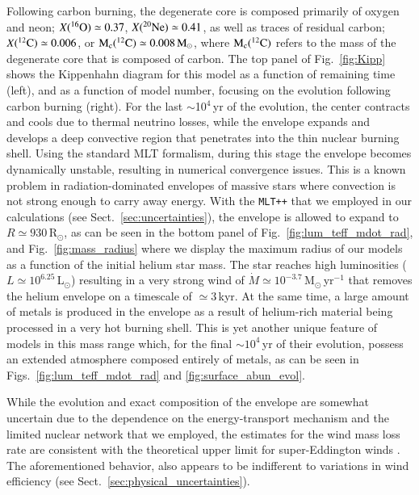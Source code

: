 \documentclass[main.tex]{subfiles}
\begin{document}
Following carbon burning, the degenerate core is composed primarily of oxygen and neon; $X(\iso{O}{16}) \simeq 0.37$, $X(\iso{Ne}{20}) \simeq 0.41$, as well as traces of residual carbon; $X(\iso{C}{12}) \simeq 0.006$, or $ \rm M_c (\iso{C}{12}) \simeq 0.008\msun$, where $\rm M_c (\iso{C}{12})$ refers to the mass of the degenerate core that is composed of carbon. The top panel of Fig.~\ref{fig:Kipp} shows the Kippenhahn diagram for this model as a function of remaining time (left), and as a function of model number, focusing on the evolution following carbon burning (right). 
For the last $\sim$10$^4$\,yr of the evolution, the center contracts and cools due to thermal neutrino losses, while the envelope 
expands and develops a deep convective region that penetrates into the thin nuclear burning shell. Using the standard MLT formalism, during this stage the envelope becomes dynamically unstable, resulting in numerical convergence issues. This is a known 
problem in radiation-dominated envelopes of massive stars where convection is not strong enough to carry away  energy. With the 
\texttt{MLT++} that we employed in our calculations  (see Sect.~\ref{sec:uncertainties}),  the envelope is allowed to expand to $R \simeq 
930$\,R$_\odot$, as can be seen in the bottom panel of Fig.~\ref{fig:lum_teff_mdot_rad}, and Fig.~\ref{fig:mass_radius} where
we display the maximum radius of our \seriesone models as a function of the initial helium star mass. The star reaches high luminosities ($L \simeq 10^{6.25}$\,L$_\odot$) 
resulting in a very strong wind of $\dot{M} \simeq 
10^{-3.7}$\,M$_\odot$\,yr$^{-1}$ that removes the 
helium envelope on a timescale of $\simeq 3$\,kyr. 
At the same time, a large amount of metals is produced in the 
envelope as a result of helium-rich material being processed in a very hot burning shell. 
This is yet another unique feature of models in this mass range which, 
for the final $\sim 10^{4}$\,yr of their evolution, possess an 
extended atmosphere composed entirely of metals, as can be seen 
in Figs.~\ref{fig:lum_teff_mdot_rad} and \ref{fig:surface_abun_evol}.


While the evolution and exact composition of the envelope are somewhat 
uncertain due to the dependence on the energy-transport mechanism and 
the limited nuclear network that we employed,  the estimates for the wind mass loss rate 
are consistent with  the theoretical upper limit for 
super-Eddington winds  \citep{Owocki:2004zz, Smith2006}. The 
aforementioned behavior, also appears to be indifferent 
to variations in wind efficiency (see Sect.~\ref{sec:physical_uncertainties}).
\end{document}
